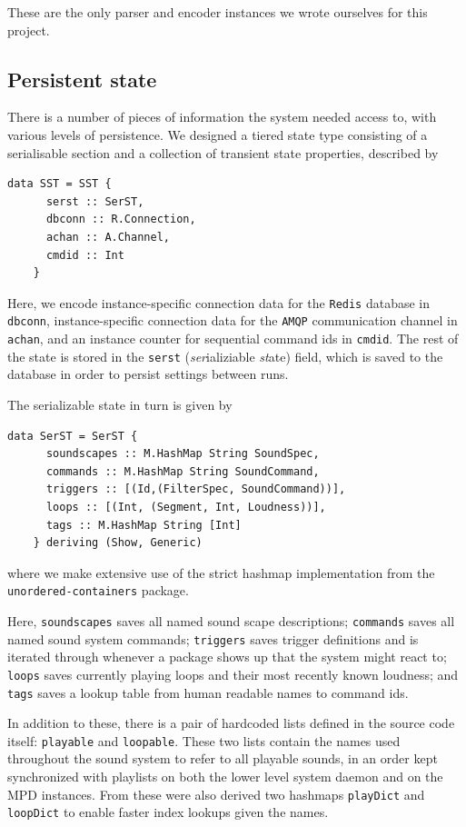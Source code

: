These are the only parser and encoder instances we wrote ourselves for
this project.


\subsection{Persistent state}
\label{sec:persistent-state}

There is a number of pieces of information the system needed access
to, with various levels of persistence. We designed a tiered state
type consisting of a serialisable section and a collection of
transient state properties, described by
\begin{verbatim}
data SST = SST {
      serst :: SerST,
      dbconn :: R.Connection,
      achan :: A.Channel,
      cmdid :: Int
    } 
\end{verbatim}
Here, we encode instance-specific connection data for the \texttt{Redis} database in
\texttt{dbconn}, instance-specific connection data for the \texttt{AMQP}
communication channel in \texttt{achan}, and an instance counter for
sequential command ids in \texttt{cmdid}. The rest of the state is
stored in the \texttt{serst} (\emph{ser}ializiable \emph{st}ate) field,
which is saved
to the database in order to persist settings between runs.

The serializable state in turn is given by
\begin{verbatim}
data SerST = SerST {
      soundscapes :: M.HashMap String SoundSpec,
      commands :: M.HashMap String SoundCommand,
      triggers :: [(Id,(FilterSpec, SoundCommand))],
      loops :: [(Int, (Segment, Int, Loudness))],
      tags :: M.HashMap String [Int]
    } deriving (Show, Generic)
\end{verbatim}
where we make extensive use of the strict hashmap implementation from
the \texttt{unordered-containers} package.

Here, \texttt{soundscapes} saves all named sound scape descriptions;
\texttt{commands} saves all named sound system commands;
\texttt{triggers} saves trigger definitions and is iterated through
whenever a package shows up that the system might react to;
\texttt{loops} saves currently playing loops and their most recently
known loudness; and \texttt{tags} saves a lookup table from human
readable names to command ids.

In addition to these, there is a pair of hardcoded lists defined in
the source code itself: \texttt{playable} and \texttt{loopable}.
These two lists contain the names used throughout the sound system to
refer to all playable sounds, in an order kept synchronized with
playlists on both the lower level system daemon and on the MPD
instances. From these were also derived two hashmaps \texttt{playDict} and \texttt{loopDict} to enable
faster index lookups given the names.

